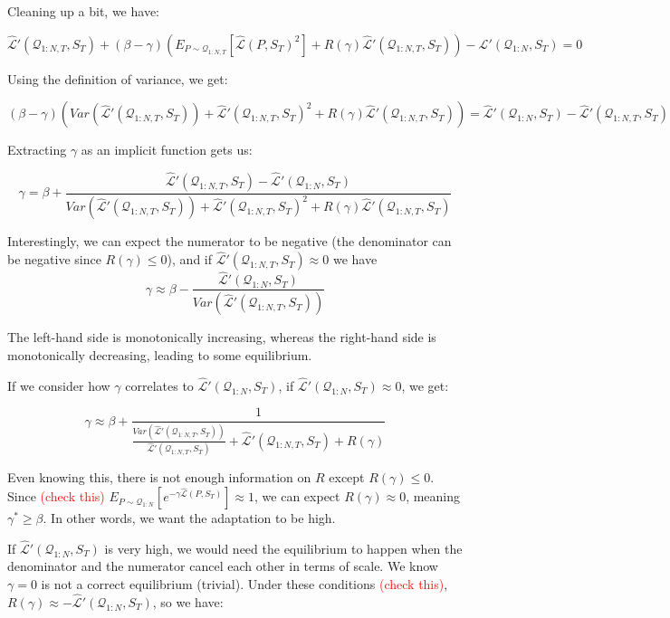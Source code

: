 \documentclass[letterpaper]{article}
\theoremstyle{definition}
\begin{document}
Cleaning up a bit, we have:

$$\hat{\mathcal{L}}'(\mathcal{Q}_{1:N,T}, S_T)+ (\beta-\gamma)\left (E_{P\sim \mathcal{Q}_{1:N,T}}\left [\hat{\mathcal{L}}(P,S_T)^2\right]+R(\gamma)\hat{\mathcal{L}}'(\mathcal{Q}_{1:N,T}, S_T)\right )  -  \hat{\mathcal{L}}'(\mathcal{Q}_{1:N},S_T)=0$$

Using the definition of variance, we get:

$$(\beta-\gamma)\left (Var(\hat{\mathcal{L}}'(\mathcal{Q}_{1:N,T},S_T))+\hat{\mathcal{L}}'(\mathcal{Q}_{1:N,T},S_T)^2 +R(\gamma)\hat{\mathcal{L}}'(\mathcal{Q}_{1:N,T}, S_T)\right )  =  \hat{\mathcal{L}}'(\mathcal{Q}_{1:N},S_T)-\hat{\mathcal{L}}'(\mathcal{Q}_{1:N,T}, S_T)$$

Extracting $\gamma$ as an implicit function gets us:

$$\gamma=\beta+\frac{\hat{\mathcal{L}}'(\mathcal{Q}_{1:N,T}, S_T)-\hat{\mathcal{L}}'(\mathcal{Q}_{1:N},S_T)}{Var(\hat{\mathcal{L}}'(\mathcal{Q}_{1:N,T},S_T))+\hat{\mathcal{L}}'(\mathcal{Q}_{1:N,T},S_T)^2 +R(\gamma)\hat{\mathcal{L}}'(\mathcal{Q}_{1:N,T}, S_T)}  $$

Interestingly, we can expect the numerator to be negative (the denominator can be negative since $R(\gamma)\leq 0$), and if $\hat{\mathcal{L}}'(\mathcal{Q}_{1:N,T}, S_T)\approx 0$ we have $$\gamma\approx \beta-\frac{\hat{\mathcal{L}}'(\mathcal{Q}_{1:N},S_T)}{ Var(\hat{\mathcal{L}}'(\mathcal{Q}_{1:N,T},S_T))} $$

The left-hand side is monotonically increasing, whereas the right-hand side is monotonically decreasing, leading to some equilibrium.

If we consider how $\gamma$ correlates to $\hat{\mathcal{L}}'(\mathcal{Q}_{1:N},S_T)$,
if $\hat{\mathcal{L}}'(\mathcal{Q}_{1:N},S_T)\approx 0$, we get:

$$\gamma\approx \beta + \frac{1}{\frac{Var(\hat{\mathcal{L}}'(\mathcal{Q}_{1:N,T},S_T))}{\hat{\mathcal{L}}'(\mathcal{Q}_{1:N,T}, S_T)}+\hat{\mathcal{L}}'(\mathcal{Q}_{1:N,T}, S_T)+R(\gamma)}$$

Even knowing this, there is not enough information on $R$ except $R(\gamma)\leq 0$.
Since \textcolor{red}{(check this)} $E_{P\sim \mathcal{Q}_{1:N}}\left[e^{-\gamma\hat{\mathcal{L}}(P,S_T)} \right]\approx 1$, we can expect $R(\gamma)\approx 0$, meaning $\gamma^*\geq \beta$. In other words, we want the adaptation to be high.

If $\hat{\mathcal{L}}'(\mathcal{Q}_{1:N},S_T)$ is very high, we would need the equilibrium to happen when the denominator and the numerator cancel each other in terms of scale. We know $\gamma=0$ is not a correct equilibrium (trivial).
Under these conditions \textcolor{red}{(check this)}, $R(\gamma)\approx -\hat{\mathcal{L}}'(\mathcal{Q}_{1:N},S_T)$,
so we have:
\end{document}
